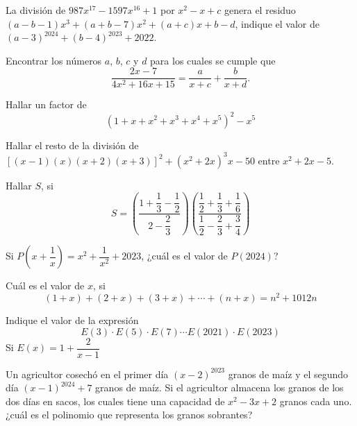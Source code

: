 \begin{section-problem}
    La división de $987x^{17} - 1597x^{16} + 1$ por $x^2 - x + c$ genera el residuo $(a - b - 1)x^3 + (a + b - 7)x^2 + (a + c)x + b - d$, indique el valor de $(a - 3)^{2024} + (b - 4)^{2023} + 2022$.
\end{section-problem}

\begin{section-problem}
    Encontrar los números $a$, $b$, $c$ y $d$ para los cuales se cumple que
    \[\frac{2x - 7}{4x^2 + 16 x + 15} = \frac{a}{x + c} + \frac{b}{x + d}.\]
\end{section-problem}

\begin{section-problem}
    Hallar un factor de
    \[ (1 + x + x^2 + x^3 + x^4 + x^5)^2 - x^5 \]
\end{section-problem}

\begin{section-problem}
    Hallar el resto de la división de $\left[(x - 1)(x)(x + 2)(x + 3)\right]^2 + (x^2 + 2x)^3 x - 50$ entre $x^2 + 2x - 5$.
\end{section-problem}


\begin{section-problem}
    Hallar $S$, si
    \[S = \left( \frac{1 + \dfrac{1}{3} - \dfrac{1}{2}}{2 - \dfrac{2}{3}} \right) \left( \frac{\dfrac{1}{2} + \dfrac{1}{3} + \dfrac{1}{6}}{\dfrac{1}{2} - \dfrac{2}{3} + \dfrac{3}{4}} \right)\]
\end{section-problem}


\begin{section-problem}
    Si $P\left(x + \dfrac{1}{x}\right) = x^2 + \dfrac{1}{x^2} + 2023$, ¿cuál es el valor de $P(2024)$?
\end{section-problem}

\begin{section-problem}
    Cuál es el valor de $x$, si
    \[(1 + x) + (2 + x) + (3 + x) + \cdots + (n + x) = n^2 + 1012n\]
\end{section-problem}

\begin{section-problem}
    Indique el valor de la expresión
    \[E(3)  \cdot E(5) \cdot E(7) \cdots E(2021) \cdot E(2023)\]
    Si $E(x) = 1 + \dfrac{2}{x - 1}$
\end{section-problem}

\begin{section-problem}
    Un agricultor cosechó en el primer día $(x - 2)^{2023}$ granos de maíz y el segundo día $(x - 1)^{2024} + 7$ granos de maíz.
    Si el agricultor almacena los granos de los dos días en sacos, los cuales tiene una capacidad de $x^2 - 3x + 2$ granos cada uno.
    ¿cuál es el polinomio que representa los granos sobrantes?
\end{section-problem}

